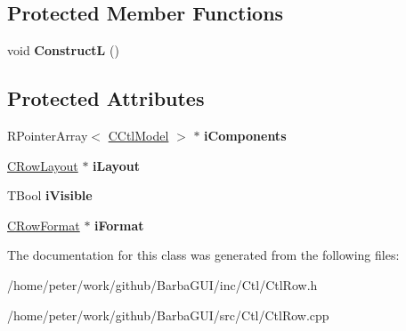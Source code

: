\subsection*{Protected Member Functions}
\begin{DoxyCompactItemize}
\item 
\mbox{\label{classCCtlRow_a7274b925917b848111a8584b110d0396}} 
void {\bfseries ConstructL} ()
\end{DoxyCompactItemize}
\subsection*{Protected Attributes}
\begin{DoxyCompactItemize}
\item 
\mbox{\label{classCCtlRow_a563f72aff84e4ad4d77ed66217457ac5}} 
R\+Pointer\+Array$<$ \hyperlink{classCCtlModel}{C\+Ctl\+Model} $>$ $\ast$ {\bfseries i\+Components}
\item 
\mbox{\label{classCCtlRow_a4ae1bb05d6eb1c1868730875b8e3c8b4}} 
\hyperlink{classCRowLayout}{C\+Row\+Layout} $\ast$ {\bfseries i\+Layout}
\item 
\mbox{\label{classCCtlRow_a5a23983f61f139bcc58eba003e590dba}} 
T\+Bool {\bfseries i\+Visible}
\item 
\mbox{\label{classCCtlRow_ad2274ce7ce1a5a14717b1d773fa5bc08}} 
\hyperlink{classCRowFormat}{C\+Row\+Format} $\ast$ {\bfseries i\+Format}
\end{DoxyCompactItemize}


The documentation for this class was generated from the following files\+:\begin{DoxyCompactItemize}
\item 
/home/peter/work/github/\+Barba\+G\+U\+I/inc/\+Ctl/Ctl\+Row.\+h\item 
/home/peter/work/github/\+Barba\+G\+U\+I/src/\+Ctl/Ctl\+Row.\+cpp\end{DoxyCompactItemize}
